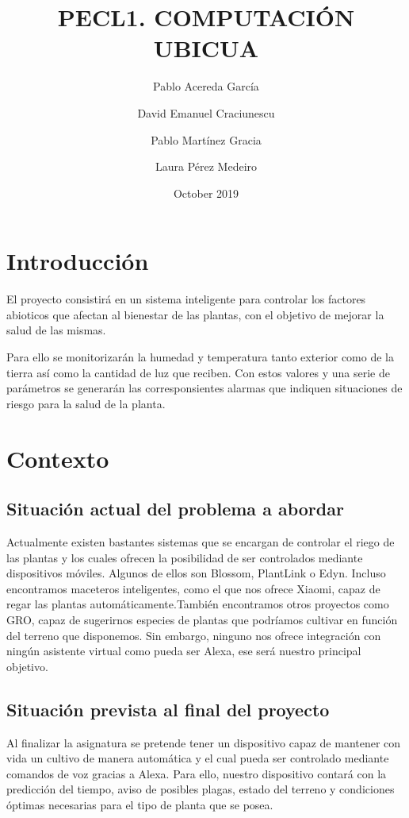 \documentclass[runningheads]{llncs}
\title{PECL1. COMPUTACIÓN UBICUA} %
\author{Pablo Acereda García \and David Emanuel Craciunescu \and Pablo Martínez Gracia \and Laura Pérez Medeiro }
\date{October 2019}
\begin{document}
\maketitle

\section{Introducción}

El proyecto consistirá en un sistema inteligente para controlar los factores abioticos que afectan al bienestar de las plantas, con el objetivo de mejorar la salud de las mismas.

Para ello se monitorizarán la humedad y temperatura tanto exterior como de la tierra así como la cantidad de luz que reciben. Con estos valores y una serie de parámetros se generarán las corresponsientes alarmas que indiquen situaciones de riesgo para la salud de la planta.

\section{Contexto}
    \subsection{Situación actual del problema a abordar}
    Actualmente existen bastantes sistemas que se encargan de controlar el riego de las plantas y los cuales ofrecen la posibilidad de ser controlados mediante dispositivos móviles. Algunos de ellos son Blossom, PlantLink o Edyn. Incluso encontramos maceteros inteligentes, como el que nos ofrece Xiaomi, capaz de regar las plantas automáticamente.También encontramos otros proyectos como GRO, capaz de sugerirnos especies de plantas que podríamos cultivar en función del terreno que disponemos.
    \newline
    Sin embargo, ninguno nos ofrece integración con ningún asistente virtual como pueda ser Alexa, ese será nuestro principal objetivo.
    
    \subsection{Situación prevista al final del proyecto}
    Al finalizar la asignatura se pretende tener un dispositivo capaz de mantener con vida un cultivo de manera automática y el cual pueda ser controlado mediante comandos de voz gracias a Alexa.
    Para ello, nuestro dispositivo contará con la predicción del tiempo, aviso de posibles plagas, estado del terreno y condiciones óptimas necesarias para el tipo de planta que se posea.
    
\end{document}
